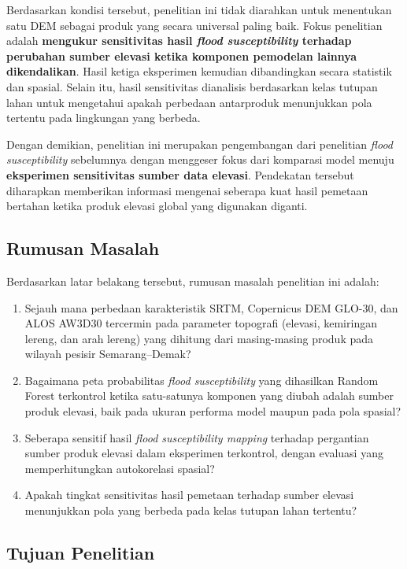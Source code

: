 \documentclass[12pt]{article}
\begin{document}
Berdasarkan kondisi tersebut, penelitian ini tidak diarahkan untuk menentukan
satu DEM sebagai produk yang secara universal paling baik. Fokus penelitian
adalah \textbf{mengukur sensitivitas hasil \textit{flood susceptibility}
terhadap perubahan sumber elevasi ketika komponen pemodelan lainnya
dikendalikan}. Hasil ketiga eksperimen kemudian dibandingkan secara statistik
dan spasial. Selain itu, hasil sensitivitas dianalisis berdasarkan kelas
tutupan lahan untuk mengetahui apakah perbedaan antarproduk menunjukkan pola
tertentu pada lingkungan yang berbeda.

Dengan demikian, penelitian ini merupakan pengembangan dari penelitian
\textit{flood susceptibility} sebelumnya dengan menggeser fokus dari
komparasi model menuju \textbf{eksperimen sensitivitas sumber data elevasi}.
Pendekatan tersebut diharapkan memberikan informasi mengenai seberapa kuat
hasil pemetaan bertahan ketika produk elevasi global yang digunakan diganti.

\subsection{Rumusan Masalah}

Berdasarkan latar belakang tersebut, rumusan masalah penelitian ini adalah:

\begin{enumerate}
\item Sejauh mana perbedaan karakteristik SRTM, Copernicus DEM GLO-30, dan
ALOS AW3D30 tercermin pada parameter topografi (elevasi, kemiringan lereng,
dan arah lereng) yang dihitung dari masing-masing produk pada wilayah
pesisir Semarang--Demak?
\item Bagaimana peta probabilitas \textit{flood susceptibility} yang
dihasilkan Random Forest terkontrol ketika satu-satunya komponen yang
diubah adalah sumber produk elevasi, baik pada ukuran performa model
maupun pada pola spasial?
\item Seberapa sensitif hasil \textit{flood susceptibility mapping}
terhadap pergantian sumber produk elevasi dalam eksperimen terkontrol,
dengan evaluasi yang memperhitungkan autokorelasi spasial?
\item Apakah tingkat sensitivitas hasil pemetaan terhadap sumber elevasi
menunjukkan pola yang berbeda pada kelas tutupan lahan tertentu?
\end{enumerate}

\subsection{Tujuan Penelitian}
\end{document}
